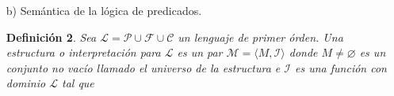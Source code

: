 \documentclass[letterpaper,11pt]{article}
\newtheorem{teo}{Definición}[]
\begin{document}
\begin{enumerate}
\begin{itemize}
\begin{teo}
                \begin{itemize}
                    \item Si $p \in \mathcal{P}$ (símbolo de predicado) con 
                    índice $n \geq 1$ y si $t_{1}, t_{2}, ..., t_{n}$ son términos
                    sobre $\mathcal{F}$ entonces $P(t_{1}, t_{2},..., t_{n})$ es 
                    una fórmula. 
                    \item Si $\varphi$ es una fórmula, entonces $\neg \varphi$ 
                    $\varphi$ también lo es.
                    \item $\varphi, \psi$ son fórmulas, entonces 
                    $\varphi \star \psi$ también lo son; donde 
                    $\star \in \{ \land, \lor, \rightarrow, \leftrightarrow \}$ 
                    \item Si $\varphi$ es una fórmula y $x$ es una variable, 
                    entonces $\forall x \varphi$ es una fórmula.
                    \item Si $\varphi$ es una fórmula y $x$ es una variable,
                    entonces $\exists x \varphi$ es una fórmula.
                    \item No hay más.
                \end{itemize}
            \end{teo}

            Es decir, la sintaxis de la lógica de predicados en forma de Backus 
            Naur se define como:
            
            \begin{center}
                $\varphi :: P(t_{1}, ..., t_{n})$ $|$ $\neg \varphi$ $|$ 
                $\varphi \land \varphi$ $|$ $\varphi \lor \varphi$ $|$ 
                $\varphi \rightarrow \varphi$ $|$ $\varphi \leftrightarrow 
                \varphi$ $|$ $\forall x \varphi$ $|$ $\exists x \varphi$ $|$
                $t_{1} = t_{2}$ $|$ $\bot$ $|$ $\top$
            \end{center}

            \item[b)] Semántica de la lógica de predicados.
            
            \begin{teo}
                Sea $\mathcal{L} = \mathcal{P} \cup \mathcal{F} \cup 
                \mathcal{C}$ un lenguaje de primer órden. Una estructura o 
                interpretación para $\mathcal{L}$ es un par 
                $\mathcal{M} = \langle M, \mathcal{I} \rangle$ donde 
                $M \neq \varnothing$ es un conjunto no vacío llamado el 
                universo de la estructura e $\mathcal{I}$ es una función con
                dominio $\mathcal{L}$ tal que 
                

\end{teo}
\end{itemize}
\end{enumerate}
\end{document}
